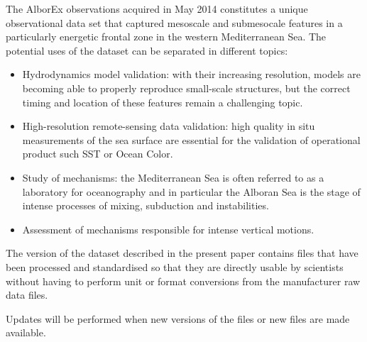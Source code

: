 \documentclass[essd,manuscript]{copernicus}
\begin{document}
The AlborEx observations acquired in May 2014 constitutes a unique observational data set that captured mesoscale and submesocale features in a particularly energetic frontal zone in the western Mediterranean Sea. The potential uses of the dataset can be separated in different topics:
\begin{itemize}
\item Hydrodynamics model validation: with their increasing resolution, models are becoming able to properly reproduce small-scale structures, but the correct timing and location of these features remain a challenging topic.
\item High-resolution remote-sensing data validation: high quality in situ measurements of the sea surface are essential for the validation of operational product such SST or Ocean Color. 
\item Study of mechanisms: the Mediterranean Sea is often referred to as a laboratory for oceanography and in particular the Alboran Sea is the stage of intense processes of mixing, subduction and instabilities.
\item Assessment of mechanisms responsible for intense vertical motions.
\end{itemize} 

The version of the dataset described in the present paper contains files that have been processed and standardised so that they are directly usable by scientists without having to perform unit or format conversions from the manufacturer raw data files.

Updates will be performed when new versions of the files or new files are made available.
\end{document}
